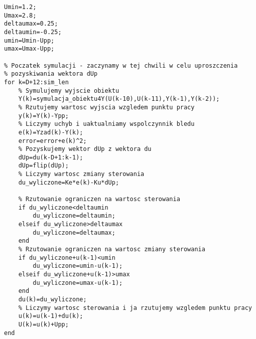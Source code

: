 \begin{lstlisting}[style=custommatlab,frame=single,label={zad4_sim_lst},caption={Implementacja regulatora DMC},captionpos=b]
% Wprowadzamy ograniczenia
Umin=1.2;
Umax=2.8;
deltaumax=0.25;
deltaumin=-0.25;
umin=Umin-Upp;
umax=Umax-Upp;

% Poczatek symulacji - zaczynamy w tej chwili w celu uproszczenia
% pozyskiwania wektora dUp
for k=D+12:sim_len
    % Symulujemy wyjscie obiektu
    Y(k)=symulacja_obiektu4Y(U(k-10),U(k-11),Y(k-1),Y(k-2));
    % Rzutujemy wartosc wyjscia wzgledem punktu pracy
    y(k)=Y(k)-Ypp;
    % Liczymy uchyb i uaktualniamy wspolczynnik bledu
    e(k)=Yzad(k)-Y(k);
    error=error+e(k)^2;
    % Pozyskujemy wektor dUp z wektora du
    dUp=du(k-D+1:k-1);
    dUp=flip(dUp);
    % Liczymy wartosc zmiany sterowania
    du_wyliczone=Ke*e(k)-Ku*dUp;

    % Rzutowanie ograniczen na wartosc sterowania
    if du_wyliczone<deltaumin
        du_wyliczone=deltaumin;
    elseif du_wyliczone>deltaumax
        du_wyliczone=deltaumax;
    end
    % Rzutowanie ograniczen na wartosc zmiany sterowania
    if du_wyliczone+u(k-1)<umin
        du_wyliczone=umin-u(k-1);
    elseif du_wyliczone+u(k-1)>umax
        du_wyliczone=umax-u(k-1);
    end
    du(k)=du_wyliczone;
    % Liczymy wartosc sterowania i ja rzutujemy wzgledem punktu pracy
    u(k)=u(k-1)+du(k);
    U(k)=u(k)+Upp;
end
    


\end{lstlisting}
